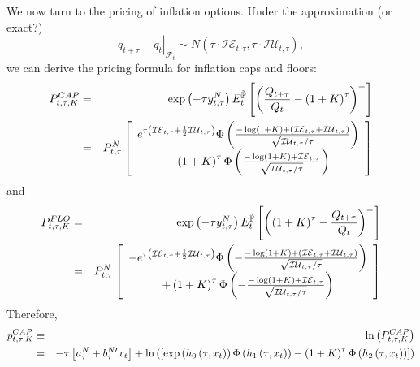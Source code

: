 \documentclass{article}
\begin{document}
We now turn to the pricing of inflation options. Under the approximation (or
exact?) 
\begin{equation*}
\left. q_{t+\tau }-q_{t}\right\vert _{\mathcal{F}_{t}}\sim N\left( \tau
\cdot \mathcal{IE}_{t,\tau },\tau \cdot \mathcal{IU}_{t,\tau }\right) ,
\end{equation*}
we can derive the pricing formula for inflation caps and floors:%
\begin{eqnarray*}
P_{t,\tau ,K}^{CAP} &=&\exp \left( -\tau y_{t,\tau }^{N}\right) E_{t}^{%
\mathbb{\tilde{P}}}\left[ \left( \frac{Q_{t+\tau }}{Q_{t}}-\left( 1+K\right)
^{\tau }\right) ^{+}\right]  \\
&=&P_{t,\tau }^{N}\left[ 
\begin{array}{c}
e^{\tau \left( \mathcal{IE}_{t,\tau }+\frac{1}{2}\mathcal{IU}_{t,\tau
}\right) }\Phi \left( \frac{-\log \left( 1+K\right) +\left( \mathcal{IE}%
_{t,\tau }+\mathcal{IU}_{t,\tau }\right) }{\sqrt{\mathcal{IU}_{t,\tau }/\tau 
}}\right)  \\ 
-\left( 1+K\right) ^{\tau }\Phi \left( \frac{-\log \left( 1+K\right) +%
\mathcal{IE}_{t,\tau }}{\sqrt{\mathcal{IU}_{t,\tau }/\tau }}\right) 
\end{array}%
\right] 
\end{eqnarray*}%
and%
\begin{eqnarray*}
P_{t,\tau ,K}^{FLO} &=&\exp \left( -\tau y_{t,\tau }^{N}\right) E_{t}^{%
\mathbb{\tilde{P}}}\left[ \left( \left( 1+K\right) ^{\tau }-\frac{Q_{t+\tau }%
}{Q_{t}}\right) ^{+}\right]  \\
&=&P_{t,\tau }^{N}\left[ 
\begin{array}{c}
-e^{\tau \left( \mathcal{IE}_{t,\tau }+\frac{1}{2}\mathcal{IU}_{t,\tau
}\right) }\Phi \left( -\frac{-\log \left( 1+K\right) +\left( \mathcal{IE}%
_{t,\tau }+\mathcal{IU}_{t,\tau }\right) }{\sqrt{\mathcal{IU}_{t,\tau }/\tau 
}}\right)  \\ 
+\left( 1+K\right) ^{\tau }\Phi \left( -\frac{-\log \left( 1+K\right) +%
\mathcal{IE}_{t,\tau }}{\sqrt{\mathcal{IU}_{t,\tau }/\tau }}\right) 
\end{array}%
\right] 
\end{eqnarray*}%
Therefore,%
\begin{eqnarray}
p_{t,\tau ,K}^{CAP} &\equiv &\ln \left( P_{t,\tau ,K}^{CAP}\right)   \notag
\\
&=&-\tau \left[ a_{\tau }^{N}+b_{\tau }^{N\prime }x_{t}\right] +\ln \left( %
\left[ \exp \left( h_{0}\left( \tau ,x_{t}\right) \right) \Phi \left(
h_{1}\left( \tau ,x_{t}\right) \right) -\left( 1+K\right) ^{\tau }\Phi
\left( h_{2}\left( \tau ,x_{t}\right) \right) \right] \right) 
\end{eqnarray}%
\end{document}
